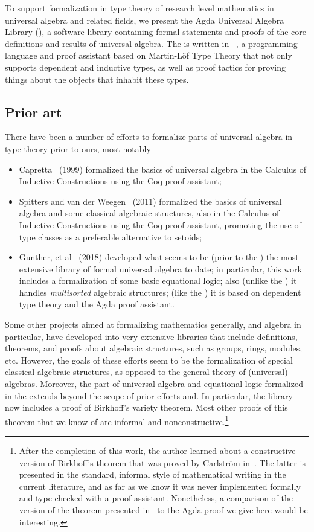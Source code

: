 To support formalization in type theory of research level mathematics in universal algebra and related fields, we present the Agda Universal Algebra Library (\agdaualib), a software library containing formal statements and proofs of the core definitions and results of universal algebra. 
The \ualib is written in \agda~\cite{Norell:2009}, a programming language and proof assistant based on Martin-L\"of Type Theory that not only supports dependent and inductive types, as well as proof tactics for proving things about the objects that inhabit these types.

\subsection{Prior art}\label{sec:prior-art}

There have been a number of efforts to formalize parts of universal algebra in type theory prior to ours, most notably
\begin{itemize}
  \item Capretta~\cite{Capretta:1999} (1999) formalized the basics of universal algebra in the Calculus of Inductive Constructions using the Coq proof assistant;
    \item Spitters and van der Weegen~\cite{Spitters:2011} (2011) formalized the basics of universal algebra and some classical algebraic structures, also in the Calculus of Inductive Constructions using the Coq proof assistant, promoting the use of type classes as a preferable alternative to setoids;
 \item Gunther, et al~\cite{Gunther:2018} (2018) developed what seems to be (prior to the \ualib) the most extensive library of formal universal algebra to date; in particular, this work includes a formalization of some basic equational logic; also (unlike the \ualib) it handles \emph{multisorted} algebraic structures; (like the \ualib) it is based on dependent type theory and the Agda proof assistant.
\end{itemize}
Some other projects aimed at formalizing mathematics generally, and algebra in particular, have developed into very extensive libraries that include definitions, theorems, and proofs about algebraic structures, such as groups, rings, modules, etc.  However, the goals of these efforts seem to be the formalization of special classical algebraic structures, as opposed to the general theory of (universal) algebras. Moreover, the part of universal algebra and equational logic formalized in the \ualib extends beyond the scope of prior efforts and. In particular, the library now includes a proof of Birkhoff's variety theorem.  Most other proofs of this theorem that we know of are informal and nonconstructive.\footnote{After the completion of this work, the author learned about a constructive version of Birkhoff's theorem that was proved by Carlstr\"om in~\cite{Carlstrom:2008}.  The latter is presented in the standard, informal style of mathematical writing in the current literature, and as far as we know it was never implemented formally and type-checked with a proof assistant. Nonetheless, a comparison of the version of the theorem presented in~\cite{Carlstrom:2008} to the Agda proof we give here would be interesting.}
